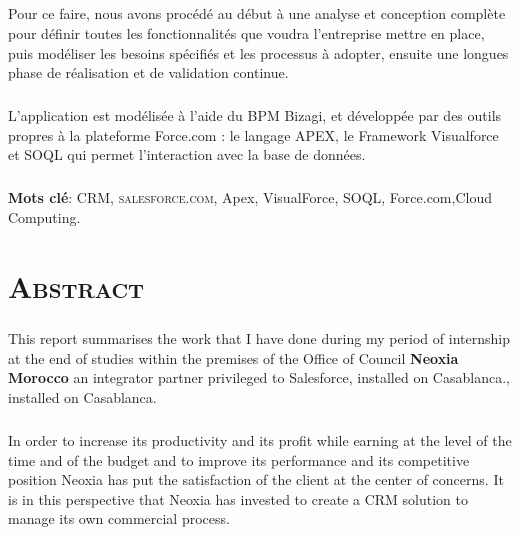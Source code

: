 \documentclass[a4paper, 12pt]{report}
\begin{document}
 \paragraph{}
Pour ce faire, nous avons procédé au début à une analyse et conception complète pour définir toutes les fonctionnalités que voudra l'entreprise mettre en place, puis modéliser les besoins spécifiés et les processus à adopter, ensuite une longues phase de réalisation et de validation continue.
\paragraph{}
L'application est modélisée à l'aide du BPM Bizagi, et développée par des outils propres à la plateforme Force.com : le langage APEX, le Framework Visualforce et SOQL qui permet l'interaction avec la base de données.

\newline
\newline
\newline
 \paragraph{}
\textbf{Mots clé}: CRM, \textsc{salesforce.com}, Apex, VisualForce, SOQL, Force.com,Cloud Computing.



\chapter*{\textsc{Abstract}}

 \paragraph{}
This report summarises the work that I have done during my period of internship at the end of studies within the premises of the Office of Council \textbf{Neoxia Morocco} an integrator partner privileged to Salesforce, installed on Casablanca., installed on Casablanca.
 \paragraph{}
In order to increase its productivity and its profit while earning at the level of the time and of the budget and to improve its performance and its competitive position Neoxia has put the satisfaction of the client at the center of concerns.
It is in this perspective that Neoxia has invested to create a CRM solution to manage its own commercial process.
\end{document}
